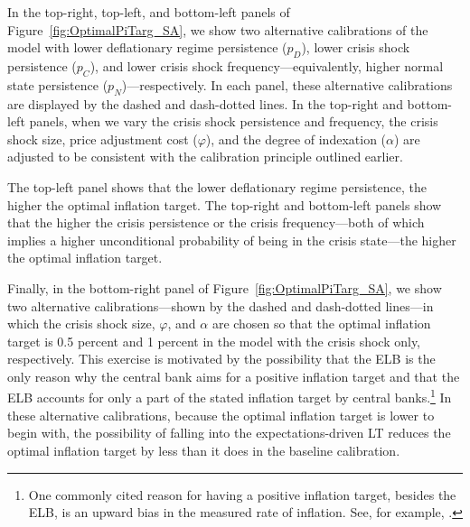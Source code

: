 \documentclass[11pt]{article}
\begin{document}
	In the top-right, top-left, and bottom-left panels of Figure~\ref{fig:OptimalPiTarg_SA}, we show two alternative calibrations of the model with lower deflationary regime persistence ($p_{D}$), lower crisis shock persistence ($p_{C}$), and lower crisis shock frequency---equivalently, higher normal state persistence ($p_{N}$)---respectively. In each panel, these alternative calibrations are displayed by the dashed and dash-dotted lines. In the top-right and bottom-left panels, when we vary the crisis shock persistence and frequency, the crisis shock size, price adjustment cost ($\varphi$), and the degree of indexation ($\alpha$) are adjusted to be consistent with the calibration principle outlined earlier. 
	
	The top-left panel shows that the lower deflationary regime persistence, the higher the optimal inflation target. The top-right and bottom-left panels show that the higher the crisis persistence or the crisis frequency---both of which implies a higher unconditional probability of being in the crisis state---the higher the optimal inflation target. 
	
	
	Finally, in the bottom-right panel of Figure~\ref{fig:OptimalPiTarg_SA}, we show two alternative calibrations---shown by the dashed and dash-dotted lines---in which the crisis shock size, $\varphi$, and $\alpha$ are chosen so that the optimal inflation target is 0.5 percent and 1 percent in the model with the crisis shock only, respectively. This exercise is motivated by the possibility that the ELB is the only reason why the central bank aims for a positive inflation target and that the ELB accounts for only a part of the stated inflation target by central banks.\footnote{One commonly cited reason for having a positive inflation target, besides the ELB, is an upward bias in the measured rate of inflation. See, for example, \citet{KileyMauskopfWilcox2007}.} In these alternative calibrations, because the optimal inflation target is lower to begin with, the possibility of falling into the expectations-driven LT reduces the optimal inflation target by less than it does in the baseline calibration.
	
\end{document}

